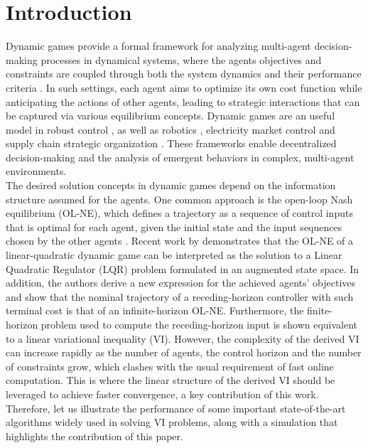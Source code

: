 \documentclass[letterpaper, 10 pt, conference]{ieeeconf}  %
\begin{document}
\section{Introduction}
Dynamic games provide a formal framework for analyzing multi-agent decision-making processes in dynamical systems, where the agents objectives and constraints are coupled through both the system dynamics and their performance criteria \cite{basar_dynamic_1999, haurie2012games}. In such settings, each agent aims to optimize its own cost function while anticipating the actions of other agents, leading to strategic interactions that can be captured via various equilibrium concepts. Dynamic games are an useful model in robust control  \cite{theodor_output-feedback_1996}, as well as robotics \cite{wang_game-theoretic_2021, spica_real-time_2020}, electricity market control \cite{hall_2022} and supply chain strategic organization \cite{hall2024game}. These frameworks enable decentralized decision-making and the analysis of emergent behaviors in complex, multi-agent environments.\\
The desired solution concepts in dynamic games depend on the information structure assumed for the agents. One common approach is the open-loop Nash equilibrium (OL-NE), which defines a trajectory as a sequence of control inputs that is optimal for each agent, given the initial state and the input sequences chosen by the other agents \cite{monti2024feedback,sassano2021constructive}.
{Recent work by \cite{benenati2024linear} demonstrates that the OL-NE of a linear-quadratic dynamic game can be interpreted as the solution to a Linear Quadratic Regulator (LQR) problem formulated in an augmented state space.} In addition, the authors derive a new expression for the achieved agents' objectives and show that the nominal trajectory of a receding-horizon controller with such terminal cost is that of an infinite-horizon OL-NE. Furthermore, the finite-horizon problem used to compute the receding-horizon input is shown equivalent to a linear variational inequality (VI). However, the complexity of the derived VI can increase rapidly as the number of agents, the control horizon and the number of constraints grow, which clashes with the usual requirement of fast online computation. This is where the linear structure of the derived VI should be leveraged to achieve faster convergence, a key contribution of this work. Therefore, let us illustrate the performance of some important state-of-the-art algorithms widely used in solving VI problems, along with a simulation that highlights the contribution of this paper. 
\end{document}
